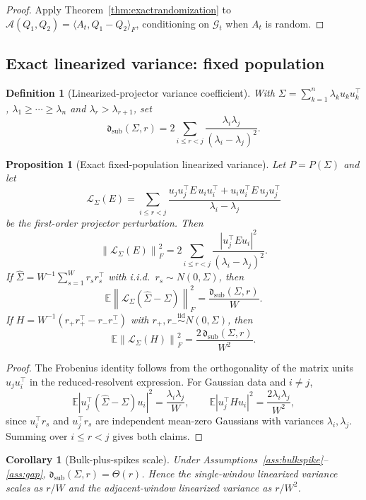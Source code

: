 \documentclass[11pt]{article}
\theoremstyle{tightplain}
\newtheorem{proposition}[theorem]{Proposition}
\newtheorem{corollary}[theorem]{Corollary}
\theoremstyle{tightdef}
\newtheorem{definition}[theorem]{Definition}
\newcommand{\E}{\mathbb E}
\newcommand{\norm}[1]{\left\lVert #1 \right\rVert}
\newcommand{\abs}[1]{\left\lvert #1 \right\rvert}
\newcommand{\dsub}{\mathfrak d_{\mathrm{sub}}}
\newcommand{\Gcal}{\mathcal G}
\begin{document}
\begin{proof}
Apply Theorem~\ref{thm:exactrandomization} to
$\mathcal A(Q_1,Q_2)=\langle A_t,Q_1-Q_2\rangle_F$, conditioning on $\Gcal_t$ when
$A_t$ is random.
\end{proof}

\subsection{Exact linearized variance: fixed population}\label{sec:fixedpop}

\begin{definition}[Linearized-projector variance coefficient]\label{def:dsub}
With $\Sigma=\sum_{k=1}^n\lambda_k u_k u_k^\top$, $\lambda_1\ge\cdots\ge\lambda_n$ and
$\lambda_r>\lambda_{r+1}$, set
\[
\dsub(\Sigma,r)=2\sum_{i\le r<j}\frac{\lambda_i\lambda_j}{(\lambda_i-\lambda_j)^2}.
\]
\end{definition}

\begin{proposition}[Exact fixed-population linearized variance]\label{prop:dsub}
Let $P=P(\Sigma)$ and let
\[
\mathcal L_\Sigma(E)=
\sum_{i\le r<j}
\frac{u_j u_j^\top E\, u_i u_i^\top+u_i u_i^\top E\, u_j u_j^\top}{\lambda_i-\lambda_j}
\]
be the first-order projector perturbation. Then
\[
\norm{\mathcal L_\Sigma(E)}_F^2
=2\sum_{i\le r<j}\frac{\abs{u_j^\top E u_i}^2}{(\lambda_i-\lambda_j)^2}.
\]
If $\widehat\Sigma=W^{-1}\sum_{s=1}^W r_s r_s^\top$ with i.i.d.\
$r_s\sim N(0,\Sigma)$, then
\[
\E\norm{\mathcal L_\Sigma(\widehat\Sigma-\Sigma)}_F^2=\frac{\dsub(\Sigma,r)}{W}.
\]
If $H=W^{-1}(r_+r_+^\top-r_-r_-^\top)$ with $r_+,r_-\stackrel{\mathrm{iid}}\sim N(0,\Sigma)$, then
\[
\E\norm{\mathcal L_\Sigma(H)}_F^2=\frac{2\,\dsub(\Sigma,r)}{W^2}.
\]
\end{proposition}

\begin{proof}
The Frobenius identity follows from the orthogonality of the matrix units
$u_j u_i^\top$ in the reduced-resolvent expression. For Gaussian data and $i\ne j$,
\[
\E\abs{u_j^\top(\widehat\Sigma-\Sigma)u_i}^2=\frac{\lambda_i\lambda_j}{W},
\qquad
\E\abs{u_j^\top H u_i}^2=\frac{2\lambda_i\lambda_j}{W^2},
\]
since $u_i^\top r_s$ and $u_j^\top r_s$ are independent mean-zero Gaussians with
variances $\lambda_i,\lambda_j$. Summing over $i\le r<j$ gives both claims.
\end{proof}

\begin{corollary}[Bulk-plus-spikes scale]\label{cor:firstorderscale}
Under Assumptions~\ref{ass:bulkspike}--\ref{ass:gap}, $\dsub(\Sigma,r)=\Theta(r)$.
Hence the single-window linearized variance scales as $r/W$ and the adjacent-window
linearized variance as $r/W^2$.
\end{corollary}
\end{document}

